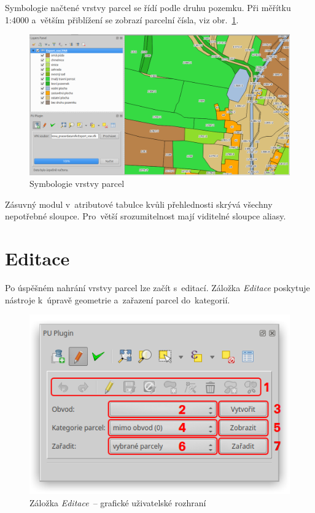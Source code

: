 Symbologie načtené vrstvy parcel se řídí podle druhu pozemku. Při měřítku 1:4000 a~větším přiblížení se zobrazí parcelní čísla, viz obr.~\ref{fig:manual_symbologie_par}.

	\begin{figure}[H]
		\centering
		\includegraphics[width=.9\textwidth]{./pictures/symbologie_par.png}
		\caption[Symbologie vrstvy parcel]{Symbologie vrstvy parcel}
		\label{fig:manual_symbologie_par}
 	\end{figure}

Zásuvný modul v~atributové tabulce kvůli přehlednosti skrývá všechny nepotřebné sloupce. Pro~větší srozumitelnost mají viditelné sloupce aliasy.

\newpage

\section{Editace}
\label{manual_editace}

Po úspěšném nahrání vrstvy parcel lze začít s~editací. Záložka \textit{Editace} poskytuje nástroje k~úpravě geometrie a~zařazení parcel do~kategorií.

	\begin{figure}[H]
		\centering
		\includegraphics[width=.55\textwidth]{./pictures/editace_gui.png}
		\caption[Záložka \textit{Editace}~– grafické uživatelské rozhraní]{Záložka \textit{Editace}~– grafické uživatelské rozhraní}
		\label{fig:manual_editace_gui}
 	\end{figure}

